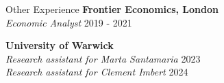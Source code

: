 \documentclass{cv_EB}
\begin{document}
 



  \begin{rSection}{Other Experience}
 \smallskip
{\bf Frontier Economics, London} \ {} \\{\em Economic Analyst}  \hfill {2019 - 2021}

\smallskip

{\bf University of Warwick} \\
{\em Research assistant for Marta Santamaria}  \hfill {2023} \\
{\em Research assistant for Clement Imbert}  \hfill {2024} \\

  \end{rSection}
\end{document}
